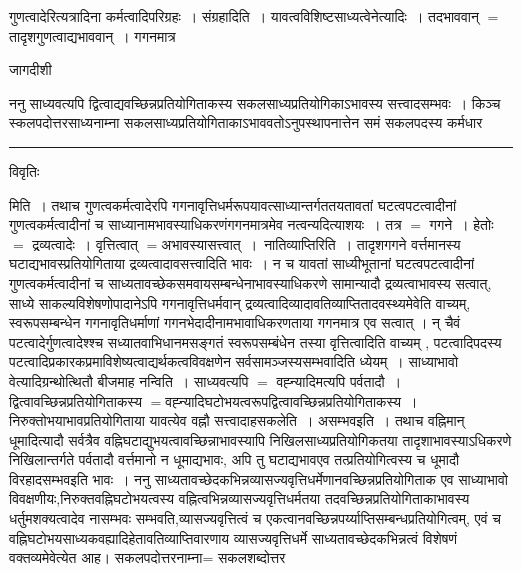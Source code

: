 \documentclass[10pt, openany]{book}
\begin{document}
{गुणत्वादेरित्यत्रादिना कर्मत्वादिपरिग्रहः~। संग्रहादिति~। यावत्वविशिष्टसाध्यत्वेनेत्यादिः~। तदभाववान् $=$ तादृशगुणत्वाद्यभाववान्~। गगनमात्र
\newpage
\begin{center} जागदीशी \end{center}

{\la ननु साध्यवत्यपि द्वित्वाद्यवच्छिन्नप्रतियोगिताकस्य सकलसाध्यप्रतियोगिकाऽभावस्य सत्त्वादसम्भवः~। किञ्च स्कलपदोत्तरसाध्यनाम्ना सकलसाध्यप्रतियोगिताकाऽभाववतोऽनुपस्थापनात्तेन समं सकलपदस्य कर्मधार}\\
\hrule
\begin{center}     विवृतिः \end{center}
मिति~। तथाच गुणत्वकर्मत्वादेरपि गगनावृत्तिधर्मरूपयावत्साध्यान्तर्गततयतावतां घटत्वपटत्वादीनां गुणत्वकर्मत्वादीनां च साध्यानामभावस्याधिकरणंगगनमात्रमेव नत्वन्यदित्याशयः~। तत्र $=$ गगने~। हेतोः $=$ द्रव्यत्वादेः~। वृत्तित्वात् $=$अभावस्यासत्त्वात्~।~{\la नातिव्याप्तिरिति~।} तादृशगगने वर्त्तमानस्य घटाद्यभावस्प्रतियोगिताया द्रव्यत्वादावसत्त्वादिति भावः~। न च यावतां साध्यीभूतानां घटत्वपटत्वादीनां गुणत्वकर्मत्वादीनां च साध्यतावच्छेकसमवायसम्बन्धेनाभावस्याधिकरणे सामान्यादौ द्रव्यत्वाभावस्य सत्वात्, साध्ये साकल्यविशेषणोपादानेऽपि गगनावृत्तिधर्मवान् द्रव्यत्वादिव्यादावतिव्याप्तितादवस्थ्यमेवेति वाच्यम्, स्वरूपसम्बन्धेन गगनावृतिधर्माणां गगनभेदादीनामभावाधिकरणताया गगनमात्र एव सत्वात् । न् चैवं पटत्वादेर्गुणत्वादेश्श्च सध्यातवाभिधानमसङ्गतं स्वरूपसम्बंधेन तस्या वृत्तित्वादिति वाच्यम् , पटत्वादिपदस्य
पटत्वादिप्रकारकप्रमाविशेष्यत्वाद्यर्थकत्वविवक्षणेन सर्वसामञ्जस्यसम्भवादिति ध्येयम्~। साध्याभावो वेत्यादिग्रन्थोत्थितौ बीजमाह {\la नन्विति~।} साध्यवत्यपि $=$ वह्न्यादिमत्यपि पर्वतादौ~। द्वित्वावच्छिन्नप्रतियोगिताकस्य $=$वह्न्यादिघटोभयत्वरूपद्वित्वावच्छिन्नप्रतियोगिताकस्य~। निरुक्तोभयाभावप्रतियोगिताया यावत्येव वह्नौ
सत्त्वादाहसकलेति~। असम्भवइति~। तथाच वह्निमान् धूमादित्यादौ सर्वत्रैव वह्निघटाद्युभयत्वावच्छिन्नाभावस्यापि निखिलसाध्यप्रतियोगिकतया तादृशाभावस्याऽधिकरणे निखिलान्तर्गते पर्वतादौ वर्त्तमानो न धूमाद्यभावः, अपि तु घटाद्यभावएव तत्प्रतियोगित्वस्य च धूमादौ विरहादसम्भवइति भावः~। ननु साध्यतावच्छेदकभिन्नव्यासज्यवृत्तिधर्मेणानवच्छिन्नप्रतियोगिताक एव साध्याभावो विवक्षणीयः,निरुक्तवह्निघटोभयत्वस्य वह्नित्वभिन्नव्यासज्यवृत्तिधर्मतया तदवच्छिन्नप्रतियोगिताकाभावस्य धर्तुमशक्यत्वादेव नासम्भवः सम्भवति,व्यासज्यवृत्तित्वं च एकत्वानवच्छिन्नपर्य्याप्तिसम्बन्धप्रतियोगित्वम्, एवं च
वह्निघटोभयसाध्यकवह्यादिहेतावतिव्याप्तिवारणाय व्यासज्यवृत्तिधर्मे साध्यतावच्छेदकभिन्नत्वं विशेषणं वक्तव्यमेवेत्येत आह।  सकलपदोत्तरनाम्ना= सकलशब्दोत्तर
\newpage
}
\end{document}
